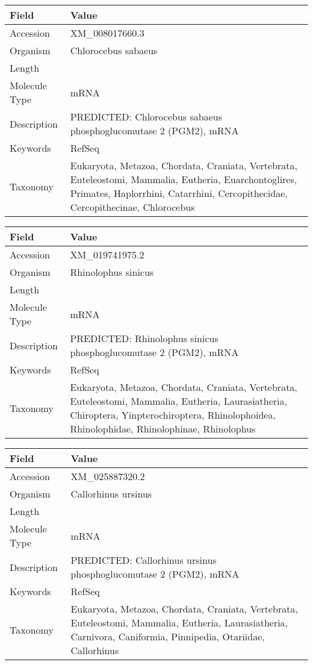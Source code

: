 \documentclass[10pt]{article}
\begin{document}
{\footnotesize
\begin{longtable}{>{\raggedright\arraybackslash}p{4.5cm} >{\raggedright\arraybackslash}p{11.5cm}}
\textbf{Field} & \textbf{Value} \\
\hline
Accession & XM\_008017660.3 \\
Organism & Chlorocebus sabaeus \\
Length & 2411 \\
Molecule Type & mRNA \\
Description & PREDICTED: Chlorocebus sabaeus phosphoglucomutase 2 (PGM2), mRNA \\
Keywords & RefSeq \\
Taxonomy & Eukaryota, Metazoa, Chordata, Craniata, Vertebrata, Euteleostomi, Mammalia, Eutheria, Euarchontoglires, Primates, Haplorrhini, Catarrhini, Cercopithecidae, Cercopithecinae, Chlorocebus \\
\end{longtable}
}

{\footnotesize
\begin{longtable}{>{\raggedright\arraybackslash}p{4.5cm} >{\raggedright\arraybackslash}p{11.5cm}}
\textbf{Field} & \textbf{Value} \\
\hline
Accession & XM\_019741975.2 \\
Organism & Rhinolophus sinicus \\
Length & 6702 \\
Molecule Type & mRNA \\
Description & PREDICTED: Rhinolophus sinicus phosphoglucomutase 2 (PGM2), mRNA \\
Keywords & RefSeq \\
Taxonomy & Eukaryota, Metazoa, Chordata, Craniata, Vertebrata, Euteleostomi, Mammalia, Eutheria, Laurasiatheria, Chiroptera, Yinpterochiroptera, Rhinolophoidea, Rhinolophidae, Rhinolophinae, Rhinolophus \\
\end{longtable}
}

{\footnotesize
\begin{longtable}{>{\raggedright\arraybackslash}p{4.5cm} >{\raggedright\arraybackslash}p{11.5cm}}
\textbf{Field} & \textbf{Value} \\
\hline
Accession & XM\_025887320.2 \\
Organism & Callorhinus ursinus \\
Length & 2593 \\
Molecule Type & mRNA \\
Description & PREDICTED: Callorhinus ursinus phosphoglucomutase 2 (PGM2), mRNA \\
Keywords & RefSeq \\
Taxonomy & Eukaryota, Metazoa, Chordata, Craniata, Vertebrata, Euteleostomi, Mammalia, Eutheria, Laurasiatheria, Carnivora, Caniformia, Pinnipedia, Otariidae, Callorhinus \\
\end{longtable}
}
\end{document}
